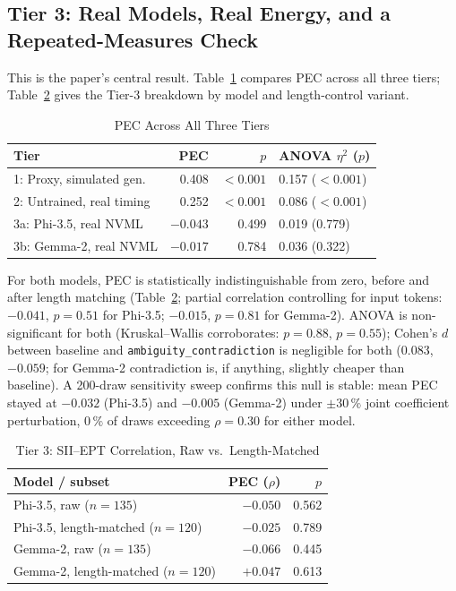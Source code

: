 \documentclass[conference]{IEEEtran}
\begin{document}
\subsection{Tier 3: Real Models, Real Energy, and a Repeated-Measures Check}
\label{sec:results-stage3}
This is the paper's central result. Table~\ref{tab:stage-summary}
compares PEC across all three tiers; Table~\ref{tab:real-pec} gives the
Tier-3 breakdown by model and length-control variant.
\begin{table}[t]
\caption{PEC Across All Three Tiers}
\label{tab:stage-summary}
\centering
\setlength{\tabcolsep}{3pt}
\begin{tabular}{@{}lrrl@{}}
\toprule
\textbf{Tier} & \textbf{PEC} & \textbf{$p$} & \textbf{ANOVA $\eta^2$ ($p$)} \\
\midrule
1: Proxy, simulated gen. & 0.408 & $<0.001$ & 0.157 ($<0.001$) \\
2: Untrained, real timing & 0.252 & $<0.001$ & 0.086 ($<0.001$) \\
3a: Phi-3.5, real NVML & $-0.043$ & 0.499 & 0.019 (0.779) \\
3b: Gemma-2, real NVML & $-0.017$ & 0.784 & 0.036 (0.322) \\
\bottomrule
\end{tabular}
\end{table}
For both models, PEC is statistically indistinguishable from zero,
before and after length matching (Table~\ref{tab:real-pec}; partial
correlation controlling for input tokens: $-0.041$, $p=0.51$ for
Phi-3.5; $-0.015$, $p=0.81$ for Gemma-2). ANOVA
is non-significant for both (Kruskal--Wallis corroborates: $p=0.88$,
$p=0.55$); Cohen's $d$ between baseline and
\texttt{ambiguity\_contradiction} is negligible for both ($0.083$,
$-0.059$; for Gemma-2 contradiction is, if anything, slightly cheaper
than baseline). A 200-draw sensitivity sweep confirms this null is
stable: mean PEC stayed at $-0.032$ (Phi-3.5) and $-0.005$ (Gemma-2)
under $\pm30\,\%$ joint coefficient perturbation, $0\,\%$ of draws
exceeding $\rho=0.30$ for either model.
\begin{table}[t]
\caption{Tier 3: SII--EPT Correlation, Raw vs.\ Length-Matched}
\label{tab:real-pec}
\centering
\setlength{\tabcolsep}{3pt}
\begin{tabular}{@{}lrr@{}}
\toprule
\textbf{Model / subset} & \textbf{PEC ($\rho$)} & \textbf{$p$} \\
\midrule
Phi-3.5, raw ($n=135$) & $-0.050$ & 0.562 \\
Phi-3.5, length-matched ($n=120$) & $-0.025$ & 0.789 \\
Gemma-2, raw ($n=135$) & $-0.066$ & 0.445 \\
Gemma-2, length-matched ($n=120$) & $+0.047$ & 0.613 \\
\bottomrule
\end{tabular}
\end{table}
\end{document}
